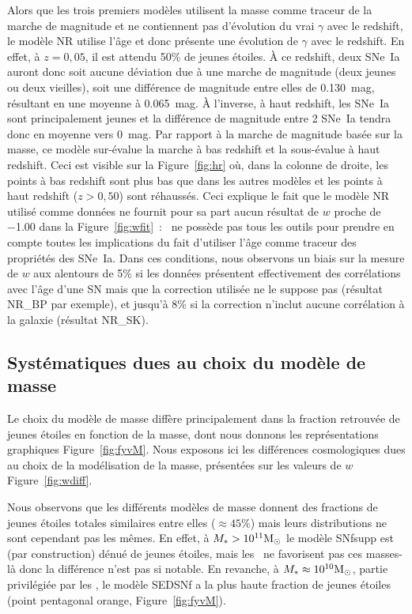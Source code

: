 \documentclass[../main/main.tex]{subfiles}
\begin{document}
Alors que les trois premiers modèles utilisent la masse comme traceur de la
marche de magnitude et ne contiennent pas d'évolution du vrai $\gamma$ avec le
redshift, le modèle NR utilise l'âge et donc présente une évolution de $\gamma$
avec le redshift. En effet, à $z=0,05$, il est attendu 50\% de jeunes étoiles. À
ce redshift, deux SNe~Ia auront donc soit aucune déviation due à une marche de
magnitude (deux jeunes ou deux vieilles), soit une différence de magnitude entre
elles de \SI{0.130}{mag}, résultant en une moyenne à \SI{0.065}{mag}. À
l'inverse, à haut redshift, les SNe~Ia sont principalement jeunes et la
différence de magnitude entre 2 SNe~Ia tendra donc en moyenne vers \SI{0}{mag}.
Par rapport à la marche de magnitude basée sur la masse, ce modèle sur-évalue la
marche à bas redshift et la sous-évalue à haut redshift. Ceci est visible sur la
Figure~\ref{fig:hr} où, dans la colonne de droite, les points à bas redshift
sont plus bas que dans les autres modèles et les points à haut redshift
($z>0,50$) sont réhaussés. Ceci explique le fait que le modèle NR utilisé comme
données ne fournit pour sa part aucun résultat de $w$ proche de \num{-1.00} dans
la Figure~\ref{fig:wfit}~: \snana\ ne possède pas tous les outils pour prendre
en compte toutes les implications du fait d'utiliser l'âge comme traceur des
propriétés des SNe~Ia. Dans ces conditions, nous observons un biais sur la
mesure de $w$ aux alentours de 5\% si les données présentent effectivement des
corrélations avec l'âge d'une SN mais que la correction utilisée ne le suppose
pas (résultat NR\_BP par exemple), et jusqu'à 8\% si la correction n'inclut
aucune corrélation à la galaxie (résultat NR\_SK).

\subsection{Systématiques dues au choix du modèle de masse}\label{ssec:modsys}

Le choix du modèle de masse diffère principalement dans la fraction retrouvée de
jeunes étoiles en fonction de la masse, dont nous donnons les représentations
graphiques Figure~\ref{fig:fyvM}. Nous exposons ici les différences
cosmologiques dues au choix de la modélisation de la masse, présentées sur les
valeurs de $w$ Figure~\ref{fig:wdiff}.

Nous observons que les différents modèles de masse donnent des fractions de
jeunes étoiles totales similaires entre elles ($\approx 45\%$) mais leurs
distributions ne sont cependant pas les mêmes. En effet, à $M_* >
10^{11}\si{\Msun}$ le modèle SNfsupp est (par construction) dénué de jeunes
étoiles, mais les \wgtmap\ ne favorisent pas ces masses-là donc la différence
n'est pas si notable. En revanche, à $M_* \approx 10^{10}\si{\Msun}$, partie
privilégiée par les \wgtmap, le modèle SEDSNf a la plus haute fraction de jeunes
étoiles (point pentagonal orange, Figure~\ref{fig:fyvM}).
\end{document}
